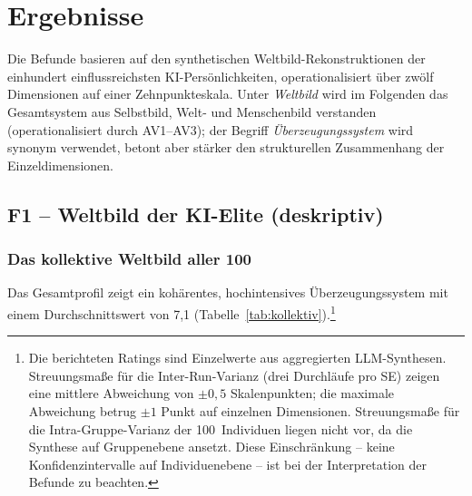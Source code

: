 \documentclass[12pt,a4paper]{article}
\begin{document}
\section{Ergebnisse}
\label{sec:ergebnisse}

Die Befunde basieren auf den synthetischen Weltbild-Rekonstruktionen der einhundert einflussreichsten KI-Pers\"onlichkeiten, operationalisiert \"uber zw\"olf Dimensionen auf einer Zehnpunkteskala. Unter \emph{Weltbild} wird im Folgenden das Gesamtsystem aus Selbstbild, Welt- und Menschenbild verstanden (operationalisiert durch AV1--AV3); der Begriff \emph{\"Uberzeugungssystem} wird synonym verwendet, betont aber st\"arker den strukturellen Zusammenhang der Einzeldimensionen.


\subsection{F1 -- Weltbild der KI-Elite (deskriptiv)}
\label{sec:ergebnisse:f1}

\subsubsection{Das kollektive Weltbild aller 100}

Das Gesamtprofil zeigt ein koh\"arentes, hochintensives \"Uberzeugungssystem mit einem Durchschnittswert von 7,1 (Tabelle~\ref{tab:kollektiv}).\footnote{Die berichteten Ratings sind Einzelwerte aus aggregierten LLM-Synthesen. Streuungsma\ss{}e f\"ur die Inter-Run-Varianz (drei Durchl\"aufe pro SE) zeigen eine mittlere Abweichung von $\pm 0{,}5$ Skalenpunkten; die maximale Abweichung betrug $\pm 1$ Punkt auf einzelnen Dimensionen. Streuungsma\ss{}e f\"ur die Intra-Gruppe-Varianz der 100~Individuen liegen nicht vor, da die Synthese auf Gruppenebene ansetzt. Diese Einschr\"ankung -- keine Konfidenzintervalle auf Individuenebene -- ist bei der Interpretation der Befunde zu beachten.}
\end{document}
